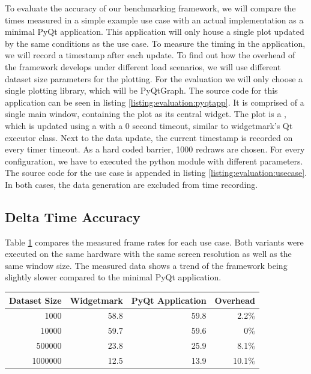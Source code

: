 To evaluate the accuracy of our benchmarking framework, we will compare the
times measured in a simple example use case with an actual implementation as a
minimal PyQt application. This application will only house a single plot updated
by the same conditions as the use case. To measure the timing in the
application, we will record a timestamp after each update. To find out how the
overhead of the framework develops under different load scenarios, we will use
different dataset size parameters for the plotting. For the evaluation we will
only choose a single plotting library, which will be PyQtGraph. The source code
for this application can be seen in listing \ref{listing:evaluation:pyqtapp}. It
is comprised of a single main window, containing the plot as its central widget.
The plot is a , which is updated
using a  with a 0 second timeout, similar to
widgetmark's Qt executor class. Next to the data update, the current timestamp
is recorded on every timer timeout. As a hard coded barrier, 1000 redraws are
chosen. For every configuration, we have to executed the python module with
different parameters. The source code for the use case is appended in listing
\ref{listing:evaluation:usecase}. In both cases, the data generation are
excluded from time recording.

\subsection{Delta Time Accuracy}

Table \ref{tab:evaluation} compares the measured frame rates for each use case.
Both variants were executed on the same hardware with the same screen resolution
as well as the same window size. The measured data shows a trend of the
framework being slightly slower compared to the minimal PyQt application.

\begin{table}[h]
\begin{center}

\label{tab:evaluation}

\begin{tabular}{rrrr}

\hline
Dataset Size & Widgetmark & PyQt Application & Overhead \\
\hline
1000         & 58.8       & 59.8             & 2.2\%    \\
10000        & 59.7       & 59.6             & 0\%      \\
500000       & 23.8       & 25.9             & 8.1\%    \\
1000000      & 12.5       & 13.9             & 10.1\%   \\
\hline

\end{tabular}
\end{center}
\end{table}

